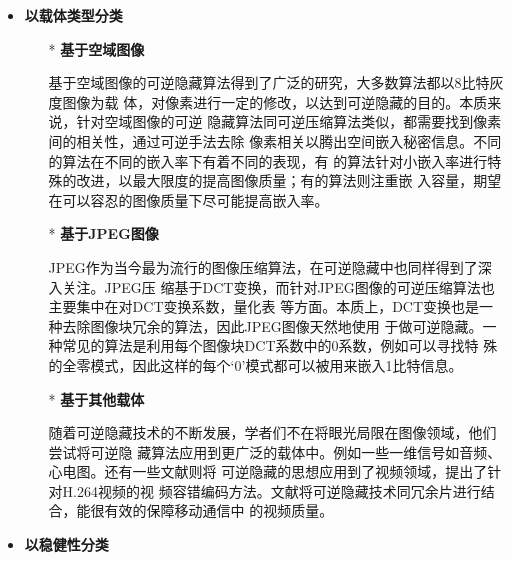 \begin{itemize}
  \setlength{\parindent}{2em}
  \vspace{-2.5mm}
  \item \textbf{以载体类型分类}\\
  \vspace{-10mm}
  \begin{itemize}
    \setlength{\parindent}{2em}
    \item[*] \textbf{基于空域图像}
    \vspace{-1mm}
    \par
    基于空域图像的可逆隐藏算法得到了广泛的研究，大多数算法都以8比特灰度图像为载
    体，对像素进行一定的修改，以达到可逆隐藏的目的。本质来说，针对空域图像的可逆
    隐藏算法同可逆压缩算法类似，都需要找到像素间的相关性，通过可逆手法去除
    像素相关以腾出空间嵌入秘密信息。不同的算法在不同的嵌入率下有着不同的表现，有
    的算法针对小嵌入率进行特殊的改进，以最大限度的提高图像质量；有的算法则注重嵌
    入容量，期望在可以容忍的图像质量下尽可能提高嵌入率。
    \par
    \vspace{-2mm}
    \item[*] \textbf{基于JPEG图像}
    \vspace{-1mm}
    \par
    JPEG作为当今最为流行的图像压缩算法，在可逆隐藏中也同样得到了深入关注。JPEG压
    缩基于DCT变换，而针对JPEG图像的可逆压缩算法也主要集中在对DCT变换系数，量化表
    等方面。本质上，DCT变换也是一种去除图像块冗余的算法，因此JPEG图像天然地使用
    于做可逆隐藏。一种常见的算法是利用每个图像块DCT系数中的0系数，例如可以寻找特
    殊的全零模式，因此这样的每个‘0’模式都可以被用来嵌入1比特信息。
    \par
    \vspace{-2mm}
    \item[*] \textbf{基于其他载体}
    \vspace{-1mm}
    \par
    随着可逆隐藏技术的不断发展，学者们不在将眼光局限在图像领域，他们尝试将可逆隐
    藏算法应用到更广泛的载体中。例如一些一维信号如音频、心电图。还有一些文献则将
    可逆隐藏的思想应用到了视频领域\cite{xu2014improved}，提出了针对H.264视频的视
    频容错编码方法。文献将可逆隐藏技术同冗余片进行结合，能很有效的保障移动通信中
    的视频质量。\\
  \end{itemize}
  \vspace{-11mm}
  \item \textbf{以稳健性分类}\\

\end{itemize}

